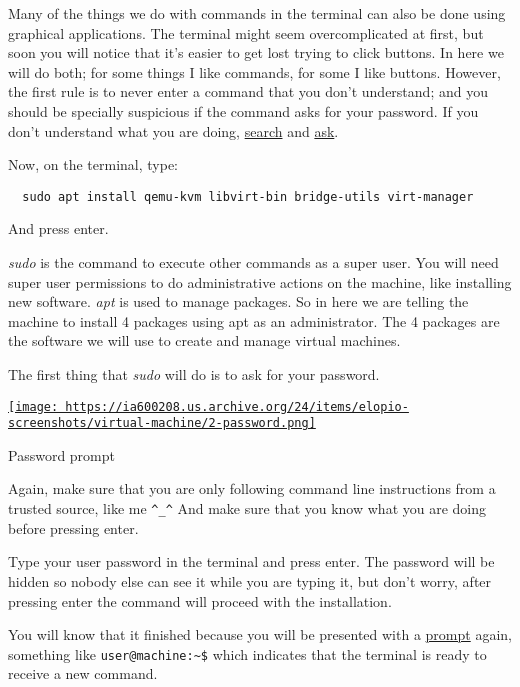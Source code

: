 \documentclass[12pt]{article}
\begin{document}
Many of the things we do with commands in the terminal can also be done using
graphical applications. The terminal might seem overcomplicated at first, but
soon you will notice that it's easier to get lost trying to click buttons. In
here we will do both; for some things I like commands, for some I like buttons.
However, the first rule is to never enter a command that you don't understand;
and you should be specially suspicious if the command asks for your password.
If you don't understand what you are doing,
\href{https://lmgtfy.com/?q=sudo}{search} and
\href{https://askubuntu.com/questions/112069/nothing-shows-up-in-the-terminal-when-i-type-my-password}
     {ask}.

Now, on the terminal, type:

\begin{verbatim}
  sudo apt install qemu-kvm libvirt-bin bridge-utils virt-manager
\end{verbatim}

And press enter.

\emph{sudo} is the command to execute other commands as a super user. You will
need super user permissions to do administrative actions on the machine, like
installing new software. \emph{apt} is used to manage packages. So in here
we are telling the machine to install 4 packages using apt as an administrator.
The 4 packages are the software we will use to create and manage virtual
machines.

The first thing that \emph{sudo} will do is to ask for your password.

\begin{center}
  \href{
    https://ia600208.us.archive.org/24/items/elopio-screenshots/virtual-machine/2-password.png}{
    \texttt{[image: 
    https://ia600208.us.archive.org/24/items/elopio-screenshots/virtual-machine/2-password.png]}
  }
  \caption{Password prompt}
\end{center}

Again, make sure that you are only following command line instructions from a
trusted source, like me \verb$^_^$ And make sure that you know what you are
doing before pressing enter.

Type your user password in the terminal and press enter. The password will be
hidden so nobody else can see it while you are typing it, but don't worry,
after pressing enter the command will proceed with the installation.

You will know that it finished because you will be presented with a
\href{https://en.wikipedia.org/wiki/Command-line_interface#Command_prompt}
     {prompt} again, something like \verb#user@machine:~$# which  indicates
that the terminal is ready to receive a new command.
\end{document}
